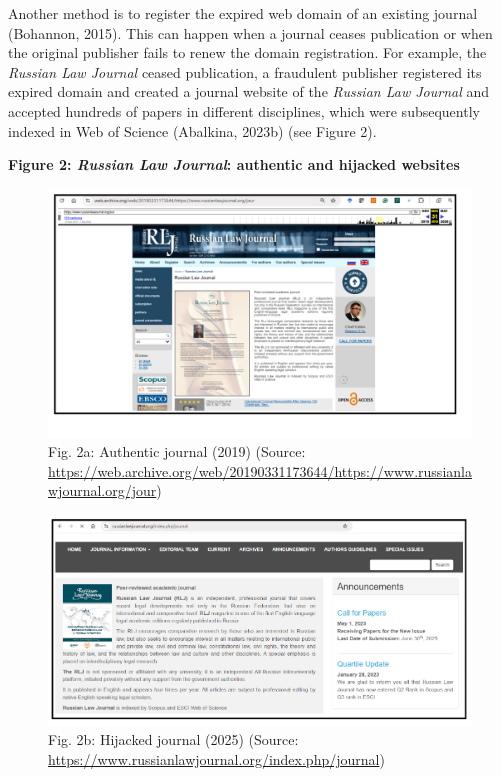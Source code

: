 \documentclass[a4paper,
fontsize=11pt,
oneside,
numbers=noperiodatend,
parskip=half-,
bibliography=totoc,
final
]{scrartcl}
\begin{document}
Another method is to register the expired web domain of an existing
journal (Bohannon, 2015). This can happen when a journal ceases
publication or when the original publisher fails to renew the domain
registration. For example, the \emph{Russian Law Journal} ceased
publication, a fraudulent publisher registered its expired domain and
created a journal website of the \emph{Russian Law Journal} and accepted
hundreds of papers in different disciplines, which were subsequently
indexed in Web of Science (Abalkina, 2023b) (see Figure 2).

\pagebreak

\textbf{Figure 2: \emph{Russian Law Journal}: authentic and hijacked
websites}

\begin{figure}[H]
\centering
\includegraphics[width=.7\textwidth]{img/fig2a.png}
\caption{Fig. 2a: Authentic journal (2019) (Source: \url{https://web.archive.org/web/20190331173644/https://www.russianlawjournal.org/jour})}
\end{figure}

\begin{figure}[H]
\centering
\includegraphics[width=.7\textwidth]{img/fig2b.png}
\caption{Fig. 2b: Hijacked journal (2025) (Source: \url{https://www.russianlawjournal.org/index.php/journal})}
\end{figure}
\end{document}
